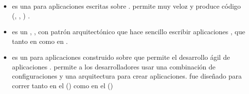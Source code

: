 \subsubsection{\isomorphicAS \javaScriptNAME \frameworksPC}
\label{cap:estadoArte:subsubsection:isomorphic_javaScript_framework}
	\begin{itemize}
		\item
			\textbf{\meteorNAME} es una \frameworkPC  \openSourcePC \realTimeINT para aplicaciones \webINT \javaScriptNAME escritas sobre \nodejsNAME \cite{online_meteor_documentation}. \meteorNAME permite \prototypingCPT muy veloz \cite{online_meteor_documentation_why} y produce código \crossPlatform (\webINT, \androidNAME, \iosNAME) \cite{online_meteor_cross_platform}.

		\item
			\textbf{\derbyNAME} \cite{online_technology_derby_officialsite} es un \frameworkPC \fullstackAS, \isomorphicAS, con patrón arquitectónico \mvcAS que hace sencillo escribir aplicaciones \collaborativeQA, \realTimeINT que \runCPT tanto en \nodejsNAME como en \browsersINT \cite{online_technology_isomorphic_javascript_frameworks}.
		
		\item
			\textbf{\mojitoNAME} es un \frameworkPC para aplicaciones \mvcAS construido sobre \yuiThreeNAME que permite el desarrollo ágil de aplicaciones \webINT. \mojitoNAME permite a los desarrolladores usar una combinación de configuraciones y una arquitectura \mvcAS para crear aplicaciones. \mojitoNAME fue diseñado para correr tanto en el \serverSideAS (\nodejsNAME) como en el \clientAS (\browserINT) \cite{online_technology_mojito_officialsite_docs_intro}


\end{itemize}
